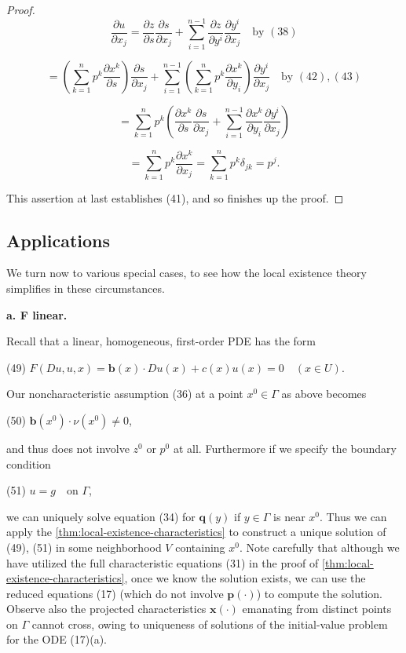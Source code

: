 \begin{proof}
$$\frac{\partial u}{\partial x_j} = \frac{\partial z}{\partial s} \frac{\partial s}{\partial x_j} + \sum_{i=1}^{n-1} \frac{\partial z}{\partial y^i} \frac{\partial y^i}{\partial x_j} \quad \text{by } (38)$$

$$= \left( \sum_{k=1}^{n} p^k \frac{\partial x^k}{\partial s} \right) \frac{\partial s}{\partial x_j} + \sum_{i=1}^{n-1} \left( \sum_{k=1}^{n} p^k \frac{\partial x^k}{\partial y_i} \right) \frac{\partial y^i}{\partial x_j} \quad \text{by } (42), (43)$$

$$= \sum_{k=1}^{n} p^k \left( \frac{\partial x^k}{\partial s} \frac{\partial s}{\partial x_j} + \sum_{i=1}^{n-1} \frac{\partial x^k}{\partial y_i} \frac{\partial y^i}{\partial x_j} \right)$$

$$= \sum_{k=1}^{n} p^k \frac{\partial x^k}{\partial x_j} = \sum_{k=1}^{n} p^k \delta_{jk} = p^j.$$

This assertion at last establishes (41), and so finishes up the proof.
\end{proof}

\subsection{Applications}
\label{sec:characteristics-applications}

We turn now to various special cases, to see how the local existence theory simplifies in these circumstances.

\textbf{a. F linear.}

Recall that a linear, homogeneous, first-order PDE has the form

(49) \quad $F(Du, u, x) = \textbf{b}(x) \cdot Du(x) + c(x)u(x) = 0 \quad (x \in U)$.

Our noncharacteristic assumption (36) at a point $x^0 \in \Gamma$ as above becomes

(50) \quad $\textbf{b}(x^0) \cdot \nu(x^0) \neq 0$,

and thus does not involve $z^0$ or $p^0$ at all. Furthermore if we specify the boundary condition

(51) \quad $u = g \quad \text{on } \Gamma$,

we can uniquely solve equation (34) for $\mathbf{q}(y)$ if $y \in \Gamma$ is near $x^0$. Thus we can apply the \cref{thm:local-existence-characteristics} to construct a unique solution of (49), (51) in some neighborhood $V$ containing $x^0$. Note carefully that although we have utilized the full characteristic equations (31) in the proof of \cref{thm:local-existence-characteristics}, once we know the solution exists, we can use the reduced equations (17) (which do not involve $\mathbf{p}(\cdot)$) to compute the solution. Observe also the projected characteristics $\mathbf{x}(\cdot)$ emanating from distinct points on $\Gamma$ cannot cross, owing to uniqueness of solutions of the initial-value problem for the ODE (17)(a).

